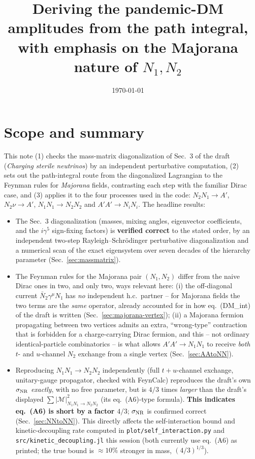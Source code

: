 \documentclass[11pt,a4paper]{article}
\title{Deriving the pandemic-DM amplitudes from the path integral,\\
\large with emphasis on the Majorana nature of $N_1,N_2$}
\author{}
\date{\today}
\newcommand{\Msq}{|\mathcal{M}|^2}
\newcommand{\code}[1]{\texttt{#1}}
\newcommand{\Ap}{A'}
\begin{document}
\maketitle

\section*{Scope and summary}

This note (1) checks the mass-matrix diagonalization of Sec.~3 of the draft
(\emph{Charging sterile neutrinos}) by an independent perturbative
computation, (2) sets out the path-integral route from the diagonalized
Lagrangian to the Feynman rules for \emph{Majorana} fields, contrasting each
step with the familiar Dirac case, and (3) applies it to the four processes
used in the code: $N_2N_1\to\Ap$, $N_2\nu\to\Ap$, $N_1N_1\to N_2N_2$ and
$\Ap\Ap\to N_iN_i$. The headline results:
\begin{itemize}
  \item The Sec.~3 diagonalization (masses, mixing angles, eigenvector
    coefficients, and the $i\gamma^5$ sign-fixing factors) is
    \textbf{verified correct} to the stated order, by an independent
    two-step Rayleigh--Schr\"odinger perturbative diagonalization and a
    numerical scan of the exact eigensystem over seven decades of the
    hierarchy parameter (Sec.~\ref{sec:massmatrix}).
  \item The Feynman rules for the Majorana pair $(N_1,N_2)$ differ from the
    naive Dirac ones in two, and only two, ways relevant here: (i) the
    off-diagonal current $\bar N_2\gamma^\mu N_1$ has \emph{no} independent
    h.c.\ partner -- for Majorana fields the two terms are the \emph{same}
    operator, already accounted for in how eq.~(DM\_int) of the draft is
    written (Sec.~\ref{sec:majorana-vertex}); (ii) a Majorana fermion
    propagating between two vertices admits an extra, ``wrong-type''
    contraction that is forbidden for a charge-carrying Dirac fermion, and
    this -- not ordinary identical-particle combinatorics -- is what allows
    $\Ap\Ap\to N_1N_1$ to receive \emph{both} $t$- and $u$-channel $N_2$
    exchange from a single vertex (Sec.~\ref{sec:AAtoNN}).
  \item Reproducing $N_1N_1\to N_2N_2$ independently (full $t+u$-channel
    exchange, unitary-gauge propagator, checked with FeynCalc) reproduces the
    draft's own $\sigma_{\rm NR}$ \emph{exactly}, with no free parameter, but
    is $4/3$ times \emph{larger} than the draft's displayed
    $\sum\Msq_{N_1N_1\to N_2N_2}$ (its eq.~(A6)-type formula). \textbf{This
    indicates eq.~(A6) is short by a factor $4/3$}; $\sigma_{\rm NR}$ is
    confirmed correct (Sec.~\ref{sec:NNtoNN}). This directly affects the
    self-interaction bound and kinetic-decoupling rate computed in
    \code{plot/self\_interaction.py} and \code{src/kinetic\_decoupling.jl}
    this session (both currently use eq.~(A6) as printed; the true bound is
    $\approx10\%$ stronger in mass, $(4/3)^{1/3}$).
\end{itemize}
\end{document}

